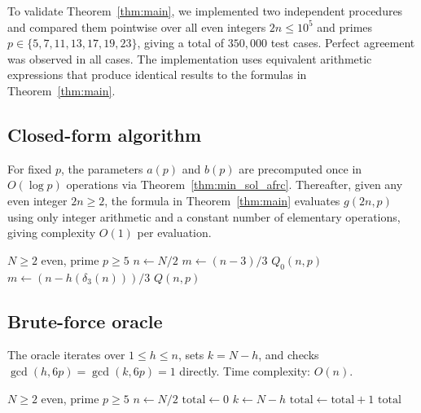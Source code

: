 \documentclass[12pt]{article}
\begin{document}
To validate Theorem~\ref{thm:main}, we implemented two independent
procedures and compared them pointwise over all even integers
$2n \le 10^5$ and primes $p \in \{5,7,11,13,17,19,23\}$,
giving a total of $350{,}000$ test cases.
Perfect agreement was observed in all cases.
The implementation uses equivalent arithmetic expressions that
produce identical results to the formulas in
Theorem~\ref{thm:main}.

\subsection{Closed-form algorithm}

For fixed $p$, the parameters $a(p)$ and $b(p)$ are precomputed
once in $O(\log p)$ operations via Theorem~\ref{thm:min_sol_afrc}.
Thereafter, given any even integer $2n \ge 2$, the formula in
Theorem~\ref{thm:main} evaluates $g(2n,p)$ using only integer
arithmetic and a constant number of elementary operations,
giving complexity $O(1)$ per evaluation.

\begin{algorithm}[H]
\caption{Closed-form count of $g(2n,p)$}
\begin{algorithmic}[1]
\Require $N \ge 2$ even, prime $p \ge 5$
\State $n \gets N/2$
    \State $m \gets (n-3)/3$
    \State \Return $Q_0(n,p)$
\Else
    \State $m \gets (n - h(\delta_3(n)))/3$
    \State \Return $Q(n,p)$
\EndIf
\end{algorithmic}
\end{algorithm}

\subsection{Brute-force oracle}

The oracle iterates over $1 \le h \le n$, sets $k = N-h$,
and checks $\gcd(h,6p)=\gcd(k,6p)=1$ directly.
Time complexity: $O(n)$.

\begin{algorithm}[H]
\caption{Brute-force oracle}
\begin{algorithmic}[1]
\Require $N \ge 2$ even, prime $p \ge 5$
\State $n \gets N/2$
\State $\mathrm{total} \gets 0$
    \State $k \gets N - h$
        \State $\mathrm{total} \gets \mathrm{total} + 1$
    \EndIf
\EndFor
\State \Return $\mathrm{total}$
\end{algorithmic}
\end{algorithm}
\end{document}

